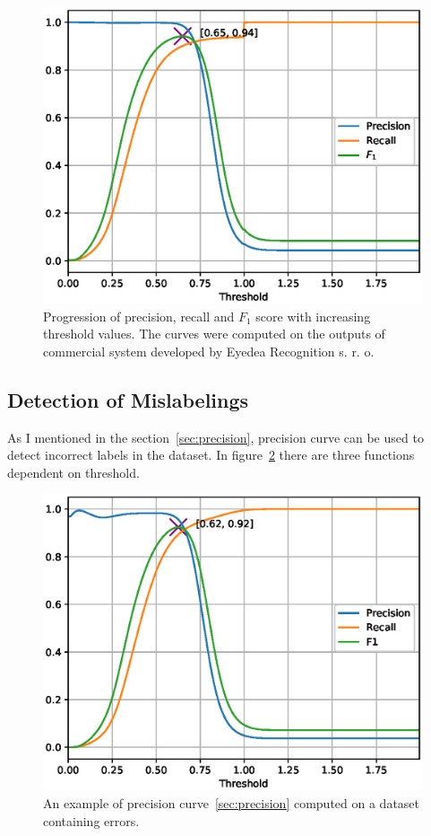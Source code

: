 \begin{figure}[H]
\centering
\includegraphics[width=0.9\columnwidth]{images/implementation/prft_eyedea.eps}
\caption{Progression of precision, recall and $F_1$ score with increasing threshold values.
The curves were computed on the outputs of commercial system developed by Eyedea Recognition s. r. o.}
\label{fig:prft_eyedea}
\end{figure}

\subsection{Detection of Mislabelings}\label{subsec:detection-mislabelings}
As I mentioned in the section~\ref{sec:precision}, precision curve can be used to detect incorrect labels in the
dataset.
In figure~\ref{fig:faulty_prft} there are three functions dependent on threshold.

\begin{figure}[H]
    \centering
    \includegraphics[width=0.9\columnwidth]{images/implementation/faulty_prft.eps}
    \caption{An example of precision curve~\ref{sec:precision} computed on a dataset containing errors.}
    \label{fig:faulty_prft}
\end{figure}

